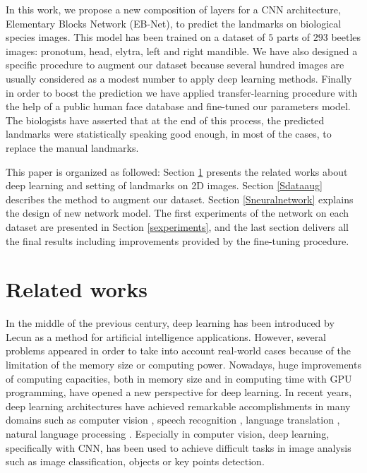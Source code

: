 \documentclass[review]{elsarticle}
\begin{document}
In this work, we propose  a new composition of layers for a CNN
architecture, Elementary Blocks Network (EB-Net), to predict the
landmarks on biological species images. This model has been 
trained on a dataset of $5$ parts of $293$ beetles images: pronotum, head, elytra, left and right mandible. We have also designed a
specific procedure to augment our dataset because several hundred
images are usually considered as a modest number to apply deep
learning methods. Finally in order to boost the prediction we have
applied transfer-learning procedure with the help of a public human
face database and fine-tuned our parameters model. The biologists have
asserted that at the end of this process, the predicted landmarks were
statistically speaking good enough, in most of the cases, to replace the manual
landmarks. 

This paper is organized as followed: Section \ref{related_works}
presents the related works about deep learning and setting of
landmarks on 2D images. Section \ref{Sdataaug} describes the method to
augment our dataset. Section \ref{Sneuralnetwork} explains the design
of new network model. The first experiments of the network on each
dataset are presented in Section \ref{sexperiments}, and the last
section delivers all the final results including improvements provided
by the fine-tuning procedure.


\section{Related works}
\label{related_works}

In the middle of the previous century, deep learning
has been introduced  by Lecun \cite{lecun2015deep} as a method for artificial
intelligence applications. However, several problems  appeared in
order to take into account real-world cases because of the limitation
of the memory size or computing power. Nowadays, huge improvements of
computing capacities, both in memory size and in computing time with
GPU programming, have opened a new perspective for deep learning. In
recent years, deep learning architectures have achieved remarkable
accomplishments in many domains such as computer vision
\cite{lecun1998gradient, krizhevsky2012imagenet,
  szegedy2015going,farabet2013learning,li2015convolutional, vu2018heritage}, speech
recognition \cite{mikolov2011strategies, hinton2012deep}, language
translation \cite{jean2014using, sutskever2014sequence}, natural
language processing \cite{lecun2015deep, collobert2011natural,
  collobert2008unified}. Especially in computer vision, deep learning,
specifically with CNN, has been used to achieve difficult tasks in
image analysis such as image classification, objects or key points
detection.
\end{document}
